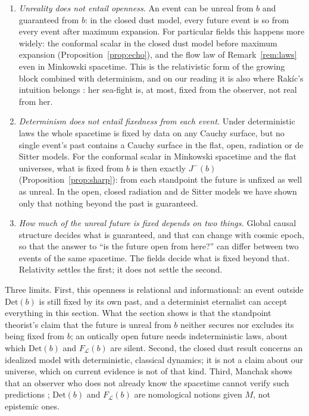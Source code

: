 \documentclass[11pt]{article}
\theoremstyle{definition}
\newcommand{\Det}{\mathrm{Det}}
\begin{document}
\begin{enumerate}
\item \emph{Unreality does not entail openness.} An event can be unreal from
$b$ and guaranteed from $b$: in the closed dust model, every future event is
so from every event after maximum expansion. For particular fields this
happens more widely: the conformal scalar in the closed dust model before
maximum expansion (Proposition~\ref{prop:echo}), and the flow law of
Remark~\ref{rem:laws} even in Minkowski spacetime. This is the relativistic
form of the growing block combined with determinism, and on our reading it is
also where Rak\'ic's intuition belongs \citep{Rakic1997}: her sea-fight is, at
most, fixed from the observer, not real from her.
\item \emph{Determinism does not entail fixedness from each event.} Under
deterministic laws the whole spacetime is fixed by data on any Cauchy
surface, but no single event's past contains a Cauchy surface in the flat,
open, radiation or de Sitter models. For the conformal scalar in Minkowski
spacetime and the flat universes, what is fixed from $b$ is then exactly
$J^-(b)$ (Proposition~\ref{prop:sharp}): from each standpoint the future is
unfixed as well as unreal. In the open, closed radiation and de Sitter models
we have shown only that nothing beyond the past is guaranteed.
\item \emph{How much of the unreal future is fixed depends on two things.}
Global causal structure decides what is guaranteed, and that can change with
cosmic epoch, so that the answer to ``is the future open from here?'' can
differ between two events of the same spacetime. The fields decide what is
fixed beyond that. Relativity settles the first; it does not settle the
second.
\end{enumerate}

Three limits. First, this openness is relational and informational: an event
outside $\Det(b)$ is still fixed by its own past, and a determinist eternalist
can accept everything in this section. What the section shows is that the
standpoint theorist's claim that the future is unreal from $b$ neither
secures nor excludes its being fixed from $b$; an ontically open future needs
indeterministic laws, about which $\Det(b)$ and $F_{\mathcal L}(b)$ are
silent. Second, the closed
dust result concerns an idealized model with deterministic, classical
dynamics; it is not a claim about our universe, which on current evidence is
not of that kind. Third, Manchak shows that an observer who does not already
know the spacetime cannot verify such predictions \citep{Manchak2008};
$\Det(b)$ and $F_{\mathcal L}(b)$ are nomological notions given $M$, not
epistemic ones.
\end{document}
